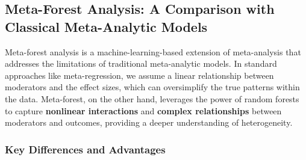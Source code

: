 \documentclass[
]{book}
\begin{document}
\subsection{Meta-Forest Analysis: A Comparison with Classical Meta-Analytic Models}\label{meta-forest-analysis-a-comparison-with-classical-meta-analytic-models}

Meta-forest analysis is a machine-learning-based extension of meta-analysis that addresses the limitations of traditional meta-analytic models. In standard approaches like meta-regression, we assume a linear relationship between moderators and the effect sizes, which can oversimplify the true patterns within the data. Meta-forest, on the other hand, leverages the power of random forests to capture \textbf{nonlinear interactions} and \textbf{complex relationships} between moderators and outcomes, providing a deeper understanding of heterogeneity.

\subsubsection{Key Differences and Advantages}\label{key-differences-and-advantages}
\end{document}
